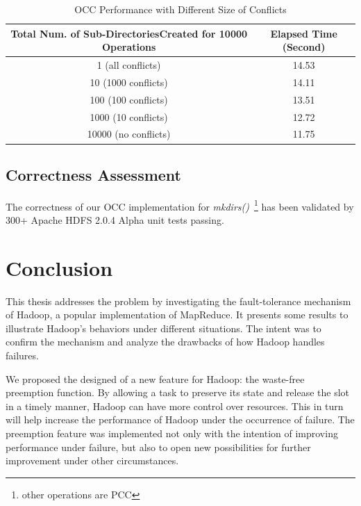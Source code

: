 \documentclass[runningheads,a4paper]{llncs}
\begin{document}
\begin{table}[ht]
	\centering
	\begin{tabular}{|c|c|}
		\hline
		\textbf{Total Num. of Sub-DirectoriesCreated for 10000 Operations} & \textbf{Elapsed Time (Second)} \\ \hline
		1 (all conflicts)                                                  & 14.53                          \\ \hline
		10 (1000 conflicts)                                                & 14.11                          \\ \hline
		100 (100 conflicts)                                                & 13.51                          \\ \hline
		1000 (10 conflicts)                                                & 12.72                          \\ \hline
		10000 (no conflicts)                                               & 11.75                          \\ \hline
	\end{tabular}
	\caption{OCC Performance with Different Size of Conflicts}
	\label{table:conflictsA}
\end{table}

\subsection{Correctness Assessment}
The correctness of our OCC implementation for \textit{mkdirs()}~\footnote{other operations are PCC} has been validated by 300+ Apache HDFS 2.0.4 Alpha unit tests passing.

\section{Conclusion}
This thesis addresses the problem by investigating the fault-tolerance mechanism of Hadoop, a popular implementation of MapReduce. It presents some results to illustrate Hadoop's behaviors under different situations. The intent was to confirm the mechanism and analyze the drawbacks of how Hadoop handles failures.

We proposed the designed of a new feature for Hadoop: the waste-free preemption function. By allowing a task to preserve its state and release the slot in a timely manner, Hadoop can have more control over resources. This in turn will help increase the performance of Hadoop under the occurrence of failure. The preemption feature was implemented not only with the intention of improving performance under failure, but also to open new possibilities for further improvement under other circumstances.
\end{document}
